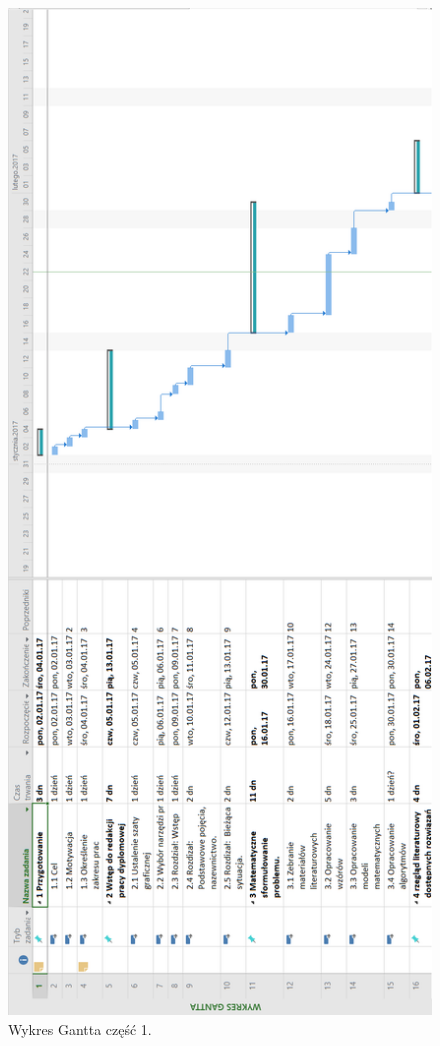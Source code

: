 \documentclass[12pt]{article} %
\begin{document}
\begin{figure}[H]
  \centering
  \includegraphics[scale=0.5]{images/g1.png}
  \caption{Wykres Gantta część 1.}
\end{figure}
\end{document}
